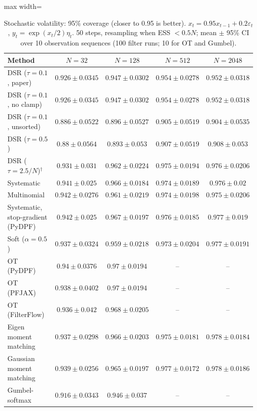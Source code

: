 \begin{table}[H]
\centering
\small
\caption{Stochastic volatility: 95\% coverage (closer to 0.95 is better). $x_t=0.95x_{t-1}+0.2\varepsilon_t$, $y_t=\exp(x_t/2)\eta_t$. 50 steps, resampling when ESS $<0.5N$; mean $\pm$ 95\% CI over 10 observation sequences (100 filter runs; 10 for OT and Gumbel).}
\label{tab:volatility-coverage95}
\begin{adjustbox}{max width=\linewidth}
\begin{tabular}{lcccc}
\toprule
Method & $N{=}32$ & $N{=}128$ & $N{=}512$ & $N{=}2048$ \\
\midrule
DSR ($\tau{=}0.1$, paper) & $0.926\pm0.0345$ & $\mathbf{0.947\pm0.0302}$ & $\mathbf{0.954\pm0.0278}$ & $\mathbf{0.952\pm0.0318}$ \\
DSR ($\tau{=}0.1$, no clamp) & $0.926\pm0.0345$ & $\mathbf{0.947\pm0.0302}$ & $\mathbf{0.954\pm0.0278}$ & $\mathbf{0.952\pm0.0318}$ \\
DSR ($\tau{=}0.1$, unsorted) & $0.886\pm0.0522$ & $0.896\pm0.0527$ & $0.905\pm0.0519$ & $0.904\pm0.0535$ \\
DSR ($\tau{=}0.5$) & $0.88\pm0.0564$ & $0.893\pm0.053$ & $0.907\pm0.0519$ & $0.908\pm0.053$ \\
DSR ($\tau{=}2.5/N$)$^\dagger$ & $0.931\pm0.031$ & $0.962\pm0.0224$ & $0.975\pm0.0194$ & $0.976\pm0.0206$ \\
\midrule
Systematic & $0.941\pm0.025$ & $0.966\pm0.0184$ & $0.974\pm0.0189$ & $0.976\pm0.02$ \\
Multinomial & $\mathbf{0.942\pm0.0276}$ & $0.961\pm0.0219$ & $0.974\pm0.0198$ & $0.975\pm0.0206$ \\
Systematic, stop-gradient (PyDPF) & $\mathbf{0.942\pm0.025}$ & $0.967\pm0.0197$ & $0.976\pm0.0185$ & $0.977\pm0.019$ \\
Soft ($\alpha{=}0.5$) & $0.937\pm0.0324$ & $0.959\pm0.0218$ & $0.973\pm0.0204$ & $0.977\pm0.0191$ \\
OT (PyDPF) & $0.94\pm0.0376$ & $0.97\pm0.0194$ & -- & -- \\
OT (PFJAX) & $0.938\pm0.0402$ & $0.97\pm0.0194$ & -- & -- \\
OT (FilterFlow) & $0.936\pm0.042$ & $0.968\pm0.0205$ & -- & -- \\
Eigen moment matching & $0.937\pm0.0298$ & $0.966\pm0.0203$ & $0.975\pm0.0181$ & $0.978\pm0.0184$ \\
Gaussian moment matching & $0.939\pm0.0256$ & $0.965\pm0.0197$ & $0.977\pm0.0172$ & $0.978\pm0.0186$ \\
Gumbel-softmax & $0.916\pm0.0343$ & $0.946\pm0.037$ & -- & -- \\

\end{tabular}
\end{adjustbox}
\end{table}
